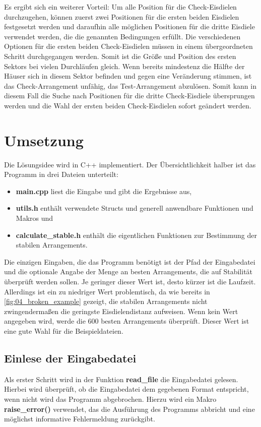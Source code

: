 \documentclass[a4paper,10pt,ngerman]{scrartcl}
\begin{document}
\medskip
Es ergibt sich ein weiterer Vorteil:
Um alle Position für die Check-Eisdielen durchzugehen, können zuerst zwei Positionen für die ersten beiden Eisdielen festgesetzt werden und daraufhin alle möglichen Positionen für die dritte Eisdiele verwendet werden, die die genannten Bedingungen erfüllt.
Die verschiedenen Optionen für die ersten beiden Check-Eisdielen müssen in einem übergeordneten Schritt durchgegangen werden.
Somit ist die Größe und Position des ersten Sektors bei vielen Durchläufen gleich.
Wenn bereits mindestenz die Hälfte der Häuser sich in diesem Sektor befinden und gegen eine Veränderung stimmen, ist das Check-Arrangement unfähig, das Test-Arrangement abzulösen.
Somit kann in diesem Fall die Suche nach Positionen für die dritte Check-Eisdiele übersprungen werden und die Wahl der ersten beiden Check-Eisdielen sofort geändert werden.

\section{Umsetzung}
Die Lösungsidee wird in C++ implementiert.
Der Übersichtlichkeit halber ist das Programm in drei Dateien unterteilt:
\begin{itemize}
    \item \textbf{main.cpp} liest die Eingabe und gibt die Ergebnisse aus,
    \item \textbf{utils.h} enthält verwendete Structs und generell anwendbare Funktionen und Makros und
    \item \textbf{calculate\_stable.h} enthält die eigentlichen Funktionen zur Bestimmung der stabilen Arrangements.
\end{itemize}
Die einzigen Eingaben, die das Programm benötigt ist der Pfad der Eingabedatei und die optionale Angabe der Menge an besten Arrangements, die auf Stabilität überprüft werden sollen.
Je geringer dieser Wert ist, desto kürzer ist die Laufzeit.
Allerdings ist ein zu niedriger Wert problemtisch, da wie bereits in \autoref{fig:04_broken_example} gezeigt, die stabilen Arrangements nicht zwingendermaßen die geringste Eisdielendistanz aufweisen.
Wenn kein Wert angegeben wird, werde die $600$ besten Arrangements überprüft.
Dieser Wert ist eine gute Wahl für die Beispieldateien.

\subsection{Einlese der Eingabedatei}
\label{sec:Einlese_der_Eingabedatei}
Als erster Schritt wird in der Funktion \textbf{read\_file} die Eingabedatei gelesen.
Hierbei wird überprüft, ob die Eingabedatei dem gegebenen Format entspricht, wenn nicht wird das Programm abgebrochen.
Hierzu wird ein Makro \textbf{raise\_error()} verwendet, das die Ausführung des Programms abbricht und eine möglichst informative Fehlermeldung zurückgibt.
\end{document}
